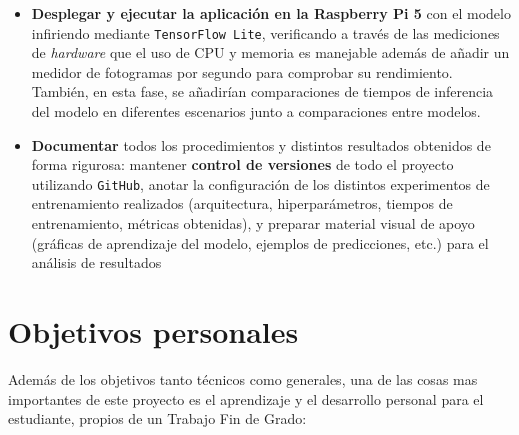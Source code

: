 \begin{itemize}
    \item \textbf{Desplegar y ejecutar la aplicación en la Raspberry Pi 5} con el modelo infiriendo mediante \texttt{TensorFlow Lite}, verificando a través de las mediciones de \textit{hardware} que el uso de CPU y memoria es manejable además de añadir un medidor de fotogramas por segundo para comprobar su rendimiento. También, en esta fase, se añadirían  comparaciones de tiempos de inferencia del modelo en  diferentes escenarios junto a comparaciones entre modelos.

    \item \textbf{Documentar} todos los procedimientos y distintos resultados obtenidos de forma rigurosa: mantener \textbf{control de versiones} de todo el proyecto utilizando \texttt{GitHub}, anotar la configuración de los distintos experimentos de entrenamiento realizados (arquitectura, hiperparámetros, tiempos de entrenamiento, métricas obtenidas), y preparar material visual de apoyo (gráficas de aprendizaje del modelo, ejemplos de predicciones, etc.) para el análisis de resultados
\end{itemize}

\section{Objetivos personales}\label{objetivos-personales}
Además de los objetivos tanto técnicos como generales, una de las cosas mas importantes de este proyecto es el aprendizaje y el desarrollo personal para el estudiante, propios de un Trabajo Fin de Grado:

